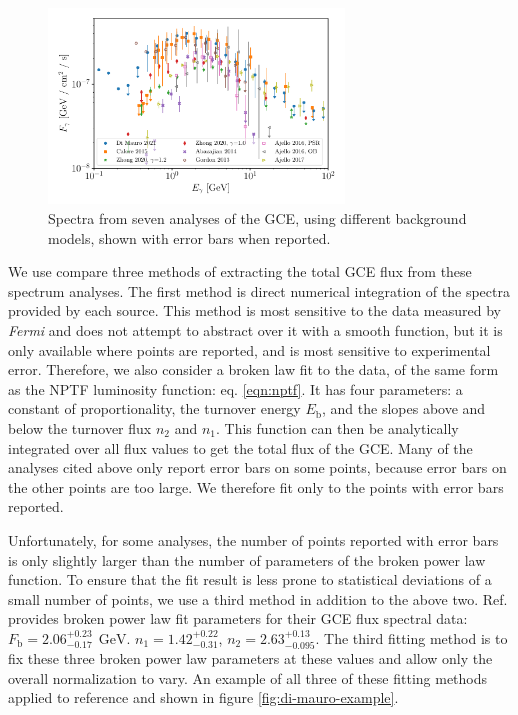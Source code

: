 \documentclass[a4paper,11pt]{article}
\newcommand{\SIasym}[4]{#1^{+#2}_{-#3}\ \SI{}{#4}}%
\newcommand{\numasym}[3]{#1^{+#2}_{-#3}}%
\begin{document}
\begin{figure}
    \centering
    \includegraphics[width=0.7\textwidth]{figs/all-spectra.pdf}
    \caption{Spectra from seven analyses of the GCE, using different background models, shown with error bars when reported.}
    \label{fig:all-spectra}
\end{figure}

We use compare three methods of extracting the total GCE flux from these spectrum analyses. The first method is direct numerical integration of the spectra provided by each source. This method is most sensitive to the data measured by \textit{Fermi} and does not attempt to abstract over it with a smooth function, but it is only available where points are reported, and is most sensitive to experimental error. Therefore, we also consider a broken law fit to the data, of the same form as the NPTF luminosity function: eq. \ref{eqn:nptf}. It has four parameters: a constant of proportionality, the turnover energy $E_\text{b}$, and the slopes above and below the turnover flux $n_2$ and $n_1$. This function can then be analytically integrated over all flux values to get the total flux of the GCE. Many of the analyses cited above only report error bars on some points, because error bars on the other points are too large. We therefore fit only to the points with error bars reported.

Unfortunately, for some analyses, the number of points reported with error bars is only slightly larger than the number of parameters of the broken power law function. To ensure that the fit result is less prone to statistical deviations of a small number of points, we use a third method in addition to the above two. Ref. \cite{Calore:2014xka} provides broken power law fit parameters for their GCE flux spectral data: $F_\text{b} = \SIasym{2.06}{0.23}{0.17}{\giga\electronvolt}$. $n_1 = \numasym{1.42}{0.22}{0.31}$, $n_2 = \numasym{2.63}{0.13}{0.095}$. The third fitting method is to fix these three broken power law parameters at these values and allow only the overall normalization to vary. An example of all three of these fitting methods applied to reference \cite{DiMauro:2021raz} and shown in figure \ref{fig:di-mauro-example}.
\end{document}
